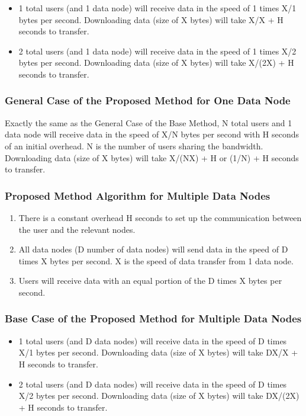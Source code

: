 \documentclass[acmsmall]{acmart}
\begin{document}
\begin{itemize} 
    \item 1 total users (and 1 data node) will receive data in the speed of 1 times X/1 bytes per second. Downloading data (size of X bytes) will take X/X + H seconds to transfer.
    \item 2 total users (and 1 data node) will receive data in the speed of 1 times X/2 bytes per second. Downloading data (size of X bytes) will take X/(2X) + H seconds to transfer.
\end{itemize}


\subsubsection{General Case of the Proposed Method for One Data Node} 
Exactly the same as the  General Case of the Base Method, N total users and 1 data node will receive data in the speed of X/N bytes per second with H seconds of an initial overhead. N is the number of users sharing the bandwidth. Downloading data (size of X bytes)  will take X/(NX) + H or (1/N) + H seconds to transfer.

\subsubsection{Proposed Method Algorithm for Multiple Data Nodes}
\begin{enumerate}
    \item There is a constant overhead H seconds to set up the communication between the user and the relevant nodes.
    \item All data nodes (D number of data nodes) will send data in the speed of D times X bytes per second. X is the speed of data transfer from 1 data node.
    \item Users will receive data with an equal portion of the D times X bytes per second.
\end{enumerate}


\subsubsection{Base Case of the Proposed Method for Multiple Data Nodes}
\begin{itemize}
    \item 1 total users (and D data nodes) will receive data in the speed of D times X/1 bytes per second. Downloading data (size of X bytes) will take DX/X + H seconds to transfer.
    \item 2 total users (and D data nodes) will receive data in the speed of D times X/2 bytes per second. Downloading data (size of X bytes) will take DX/(2X) + H seconds to transfer.
\end{itemize}
\end{document}
